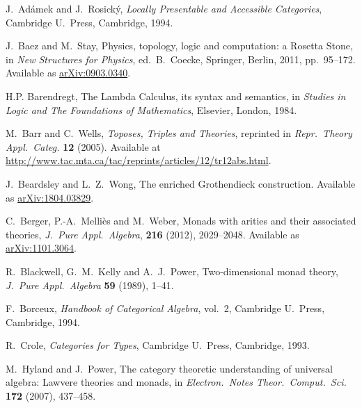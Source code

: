 \documentclass{amsart}
\theoremstyle{definition}
\begin{document}
\begin{thebibliography}{100}

 J.\ Ad\'{a}mek and J.\ Rosick\'{y}, \textsl{Locally Presentable and Accessible Categories}, Cambridge U.\ Press, Cambridge, 1994.

 J.\ Baez and M.\ Stay, Physics, topology, logic and computation: a Rosetta Stone, in \textsl{New Structures for Physics}, ed.\ B.\ Coecke, Springer, Berlin, 2011, pp.\ 95--172.  Available as \href{https://arxiv.org/abs/0903.0340}{arXiv:0903.0340}.

 H.P. Barendregt, The Lambda Calculus, its syntax and semantics, in \textsl{Studies in Logic and The Foundations of Mathematics}, Elsevier, London, 1984.
	
 M.\ Barr and C.\ Wells, \textsl{Toposes, Triples and Theories}, reprinted in \textsl{Repr.\ Theory Appl.\ Categ.} \textbf{12} (2005).   Available at \href{http://www.tac.mta.ca/tac/reprints/articles/12/tr12abs.html}{http://www.tac.mta.ca/tac/reprints/articles/12/tr12abs.html}.

 J.\ Beardsley and L.\ Z.\ Wong, The enriched Grothendieck construction.  Available as \href{https://arxiv.org/abs/1804.03829}{arXiv:1804.03829}.
	
 C.\ Berger, P.-A.\ Melli\`es and M.\ Weber, Monads with arities and their associated theories, \textsl{J.\ Pure Appl.\ Algebra}, \textbf{216} (2012), 2029--2048.  Available as \href{https://arxiv.org/abs/1101.3064}{arXiv:1101.3064}.

 R.\ Blackwell, G.\ M.\ Kelly and A.\ J.\ Power, Two-dimensional monad theory, 
\textsl{J.\ Pure Appl.\ Algebra} \textbf{59} (1989), 1--41. 
 
 F.\ Borceux, \textsl{Handbook of Categorical Algebra}, vol.\ 2, Cambridge U.\ Press, Cambridge, 1994.


 R.\ Crole, \textsl{Categories for Types}, Cambridge U.\ Press, Cambridge, 1993.

 M.\ Hyland and J.\ Power, The category theoretic understanding of 
universal algebra: Lawvere theories and monads, in \textsl{Electron.\ Notes Theor.\ Comput.\ 
Sci.} \textbf{172} (2007), 437--458.


\end{thebibliography}
\end{document}
